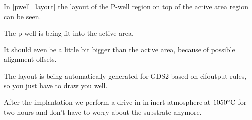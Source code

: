 In \autoref{pwell_layout} the layout of the P-well region on top of the active area region can be seen.

The p-well is being fit into the active area.

It should even be a little bit bigger than the active area, because of possible alignment offsets.

The layout is being automatically generated for GDS2 based on cifoutput rules, so you just have to draw you well.

After the implantation we perform a drive-in in inert atmosphere at $1050\degreesC$ for two hours and don't have to worry about the substrate anymore.
